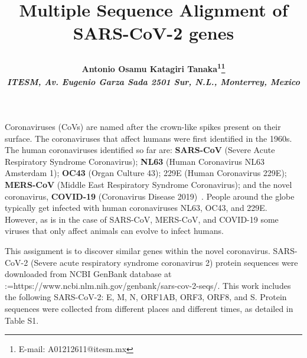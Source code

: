 \documentclass[11pt]{article}
\makeatletter
\def\NormalBaseline{\def\baselinestretch{1.1}}
\def\@shorttitle{\@empty}
\def\shorttitle#1{\gdef\@shorttitle{#1}}
\def\BreakURLText#1{\@tfor\brk@tempa:=#1\do{\brk@tempa\hskip0pt}}
\makeatother
\begin{document}
\renewcommand*\rmdefault{bch}\normalfont\upshape

\shorttitle{Class Assignment}

\date{}  

  
\title{\NormalBaseline\raggedright\bfseries Multiple Sequence Alignment of SARS-CoV-2 genes}
  \let\origthanks\thanks
\renewcommand\thanks[1]{\begingroup\let\rlap\relax\origthanks{#1}\endgroup}
\author{\hskip2pc\parbox{.95\textwidth}{\bfseries\large Antonio Osamu Katagiri Tanaka\textsuperscript{1}\thanks{E-mail: A01212611@itesm.mx}
      \\[3pt] 
    \normalfont\itshape\NormalBaseline \textsuperscript{} 
    ITESM\unskip, \normalfont\itshape\NormalBaseline Av. Eugenio Garza Sada 2501 Sur\unskip, N.L.\unskip, Monterrey\unskip, Mexico}}
    
    
\maketitle 
\pagestyle{custom}
Coronaviruses (CoVs) are named after the crown-like spikes present on their surface. The coronaviruses that affect humans were first identified in the 1960s. The human coronaviruses identified so far are: \textbf{SARS-CoV} (Severe Acute Respiratory Syndrome Coronavirus); \textbf{NL63} (Human Coronavirus NL63 Amsterdam 1); \textbf{OC43} (Organ Culture 43); 229E (Human Coronavirus 229E); \textbf{MERS-CoV} (Middle East Respiratory Syndrome Coronavirus); and the novel coronavirus, \textbf{COVID-19} (Coronavirus Disease 2019)\unskip~\cite{689640:16324861}. People around the globe typically get infected with human coronaviruses NL63, OC43, and 229E. However, as is in the case of SARS-CoV, MERS-CoV, and COVID-19 some viruses that only affect animals can evolve to infect humans.\unskip~\cite{689640:16320636}

This assignment is to discover similar genes within the novel coronavirus. SARS-CoV-2 (Severe acute respiratory syndrome coronavirus 2) protein sequences were downloaded from NCBI GenBank database at \BreakURLText{https://www.ncbi.nlm.nih.gov/genbank/sars-cov-2-seqs/.} This work includes the following SARS-CoV-2: E, M, N, ORF1AB, ORF3, ORF8, and S. Protein sequences were collected from different places and different times, as detailed in Table S1.
\end{document}
